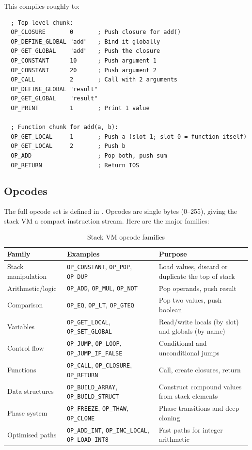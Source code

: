 This compiles roughly to:

\begin{verbatim}
  ; Top-level chunk:
  OP_CLOSURE       0       ; Push closure for add()
  OP_DEFINE_GLOBAL "add"   ; Bind it globally
  OP_GET_GLOBAL    "add"   ; Push the closure
  OP_CONSTANT      10      ; Push argument 1
  OP_CONSTANT      20      ; Push argument 2
  OP_CALL          2       ; Call with 2 arguments
  OP_DEFINE_GLOBAL "result"
  OP_GET_GLOBAL    "result"
  OP_PRINT         1       ; Print 1 value

  ; Function chunk for add(a, b):
  OP_GET_LOCAL     1       ; Push a (slot 1; slot 0 = function itself)
  OP_GET_LOCAL     2       ; Push b
  OP_ADD                   ; Pop both, push sum
  OP_RETURN                ; Return TOS
\end{verbatim}

\subsection{Opcodes}\label{subsec:stack-opcodes}

The full opcode set is defined in . Opcodes are
single bytes (0--255), giving the stack VM a compact instruction stream. Here are
the major families:

\begin{table}[h]
\centering
\caption{Stack VM opcode families}\label{tab:stack-opcode-families}
\begin{tabular}{@{} l l p{5.5cm} @{}}
\toprule
\textbf{Family} & \textbf{Examples} & \textbf{Purpose} \\
\midrule
Stack manipulation & \texttt{OP\_CONSTANT}, \texttt{OP\_POP}, \texttt{OP\_DUP} &
  Load values, discard or duplicate the top of stack \\
Arithmetic/logic & \texttt{OP\_ADD}, \texttt{OP\_MUL}, \texttt{OP\_NOT} &
  Pop operands, push result \\
Comparison & \texttt{OP\_EQ}, \texttt{OP\_LT}, \texttt{OP\_GTEQ} &
  Pop two values, push boolean \\
Variables & \texttt{OP\_GET\_LOCAL}, \texttt{OP\_SET\_GLOBAL} &
  Read/write locals (by slot) and globals (by name) \\
Control flow & \texttt{OP\_JUMP}, \texttt{OP\_LOOP}, \texttt{OP\_JUMP\_IF\_FALSE} &
  Conditional and unconditional jumps \\
Functions & \texttt{OP\_CALL}, \texttt{OP\_CLOSURE}, \texttt{OP\_RETURN} &
  Call, create closures, return \\
Data structures & \texttt{OP\_BUILD\_ARRAY}, \texttt{OP\_BUILD\_STRUCT} &
  Construct compound values from stack elements \\
Phase system & \texttt{OP\_FREEZE}, \texttt{OP\_THAW}, \texttt{OP\_CLONE} &
  Phase transitions and deep cloning \\
Optimised paths & \texttt{OP\_ADD\_INT}, \texttt{OP\_INC\_LOCAL}, \texttt{OP\_LOAD\_INT8} &
  Fast paths for integer arithmetic \\
\bottomrule
\end{tabular}
\end{table}

